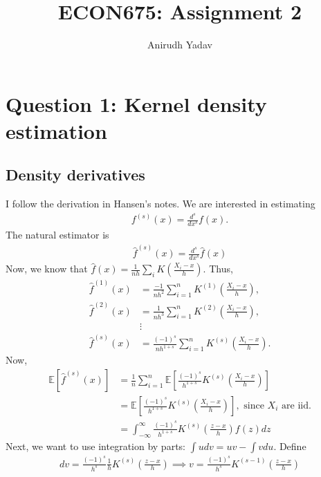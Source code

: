 \documentclass[12pt]{article}
\title{ECON675: Assignment 2}
\author{Anirudh Yadav}
\newcommand{\E}{\mathbb{E}}
\begin{document}
\maketitle

\setcounter{tocdepth}{2}
\tableofcontents

\newpage

\section{Question 1: Kernel density estimation}

\subsection{Density derivatives}
I follow the derivation in Hansen's notes. We are interested in estimating
\begin{align*}
f^{(s)}(x) = \frac{d^s}{dx^s}f(x).
\end{align*}
The natural estimator is
\begin{align*}
\hat f^{(s)}(x)= \frac{d^s}{dx^s}\hat f(x)
\end{align*}
Now, we know that $\hat f(x) = \frac{1}{nh}\sum_i K\left(\frac{X_i - x}{h}\right)$. Thus,
\begin{align*}
\hat f^{(1)}(x) &= \frac{-1}{nh^2}\sum_{i=1}^n K^{(1)}\left(\frac{X_i - x}{h}\right),\\
\hat f^{(2)}(x) &= \frac{1}{nh^3}\sum_{i=1}^n K^{(2)}\left(\frac{X_i - x}{h}\right),\\
&\vdots \\
\hat f^{(s)}(x) &= \frac{(-1)^s}{nh^{1+s}}\sum_{i=1}^n K^{(s)}\left(\frac{X_i - x}{h}\right).
\end{align*}
Now,
\begin{align*}
\E[\hat f^{(s)}(x)] &= \frac{1}{n} \sum_{i=1}^n \E\left[ \frac{(-1)^s}{h^{1+s}}K^{(s)}\left(\frac{X_i - x}{h}\right)\right]\\
&=\E\left[ \frac{(-1)^s}{h^{1+s}}K^{(s)}\left(\frac{X_i - x}{h}\right)\right], \text{ since $X_i$ are iid}.\\
&=\int_{-\infty}^{\infty} \frac{(-1)^s}{h^{1+s}}K^{(s)}\left(\frac{z - x}{h}\right)f(z)dz
\end{align*}
Next, we want to use integration by parts: $\int u dv = uv - \int vdu$. Define
\begin{align*}
dv = \frac{(-1)^s}{h^{s}}\frac{1}{h}K^{(s)}\left(\frac{z - x}{h}\right) \implies v = \frac{(-1)^s}{h^{s}}K^{(s-1)}\left(\frac{z - x}{h}\right)
\end{align*}
\end{document}
